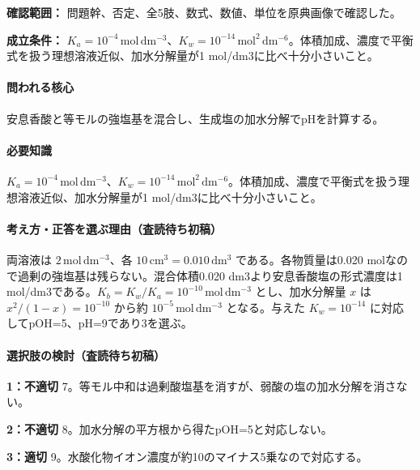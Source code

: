 \noindent\textbf{確認範囲：} 問題幹、否定、全5肢、数式、数値、単位を原典画像で確認した。\par

\noindent\textbf{成立条件：} \(K_a=10^{-4}\,\mathrm{mol\,dm^{-3}}\)、\(K_w=10^{-14}\,\mathrm{mol^2\,dm^{-6}}\)。体積加成、濃度で平衡式を扱う理想溶液近似、加水分解量が1 mol/dm3に比べ十分小さいこと。\par

\paragraph{問われる核心} 安息香酸と等モルの強塩基を混合し、生成塩の加水分解でpHを計算する。

\paragraph{必要知識} \(K_a=10^{-4}\,\mathrm{mol\,dm^{-3}}\)、\(K_w=10^{-14}\,\mathrm{mol^2\,dm^{-6}}\)。体積加成、濃度で平衡式を扱う理想溶液近似、加水分解量が1 mol/dm3に比べ十分小さいこと。

\paragraph{考え方・正答を選ぶ理由（査読待ち初稿）} 両溶液は \(2\,\mathrm{mol\,dm^{-3}}\)、各 \(10\,\mathrm{cm^3}=0.010\,\mathrm{dm^3}\) である。各物質量は0.020 molなので過剰の強塩基は残らない。混合体積0.020 dm3より安息香酸塩の形式濃度は1 mol/dm3である。\(K_b=K_w/K_a=10^{-10}\,\mathrm{mol\,dm^{-3}}\) とし、加水分解量 \(x\) は \(x^2/(1-x)=10^{-10}\) から約 \(10^{-5}\,\mathrm{mol\,dm^{-3}}\) となる。与えた \(K_w=10^{-14}\) に対応してpOH=\allowbreak{}5、pH=\allowbreak{}9であり3を選ぶ。

\paragraph{選択肢の検討（査読待ち初稿）}\mbox{}\par

\noindent\textbf{1：不適切} 7。等モル中和は過剰酸塩基を消すが、弱酸の塩の加水分解を消さない。\par

\noindent\textbf{2：不適切} 8。加水分解の平方根から得たpOH=\allowbreak{}5と対応しない。\par

\noindent\textbf{3：適切} 9。水酸化物イオン濃度が約10のマイナス5乗なので対応する。\par


